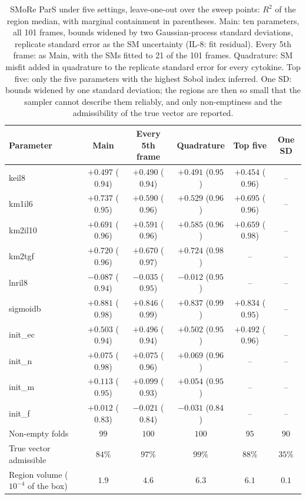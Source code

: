 \begin{table}[h]
\centering\footnotesize
\caption{SMoRe ParS under five settings, leave-one-out over the sweep points: $R^2$ of the region median, with marginal containment in parentheses. Main: ten parameters, all 101 frames, bounds widened by two Gaussian-process standard deviations, replicate standard error as the SM uncertainty (IL-8: fit residual). Every 5th frame: as Main, with the SMs fitted to 21 of the 101 frames. Quadrature: SM misfit added in quadrature to the replicate standard error for every cytokine. Top five: only the five parameters with the highest Sobol index inferred. One SD: bounds widened by one standard deviation; the regions are then so small that the sampler cannot describe them reliably, and only non-emptiness and the admissibility of the true vector are reported.}
\label{tab:app_ident}
\setlength{\tabcolsep}{3pt}
\begin{tabular}{lccccc}
\toprule
\textbf{Parameter} & \textbf{Main} & \textbf{Every 5th frame} & \textbf{Quadrature} & \textbf{Top five} & \textbf{One SD} \\
\midrule
keil8 & $+0.497$ ($0.94$) & $+0.490$ ($0.94$) & $+0.491$ ($0.95$) & $+0.454$ ($0.96$) & -- \\
km1il6 & $+0.737$ ($0.95$) & $+0.590$ ($0.96$) & $+0.529$ ($0.96$) & $+0.695$ ($0.96$) & -- \\
km2il10 & $+0.691$ ($0.96$) & $+0.591$ ($0.96$) & $+0.585$ ($0.96$) & $+0.659$ ($0.98$) & -- \\
km2tgf & $+0.720$ ($0.96$) & $+0.670$ ($0.97$) & $+0.724$ ($0.98$) & -- & -- \\
lnril8 & $-0.087$ ($0.94$) & $-0.035$ ($0.95$) & $-0.012$ ($0.95$) & -- & -- \\
sigmoidb & $+0.881$ ($0.98$) & $+0.846$ ($0.99$) & $+0.837$ ($0.99$) & $+0.834$ ($0.95$) & -- \\
init\_ec & $+0.503$ ($0.94$) & $+0.496$ ($0.94$) & $+0.502$ ($0.95$) & $+0.492$ ($0.96$) & -- \\
init\_n & $+0.075$ ($0.98$) & $+0.075$ ($0.96$) & $+0.069$ ($0.96$) & -- & -- \\
init\_m & $+0.113$ ($0.95$) & $+0.099$ ($0.93$) & $+0.054$ ($0.95$) & -- & -- \\
init\_f & $+0.012$ ($0.83$) & $-0.021$ ($0.84$) & $-0.031$ ($0.84$) & -- & -- \\
\midrule
Non-empty folds & $99$ & $100$ & $100$ & $95$ & $90$ \\
True vector admissible & $84\%$ & $97\%$ & $99\%$ & $88\%$ & $35\%$ \\
Region volume ($10^{-4}$ of the box) & $1.9$ & $4.6$ & $6.3$ & $6.1$ & $0.1$ \\
\bottomrule
\end{tabular}
\end{table}
